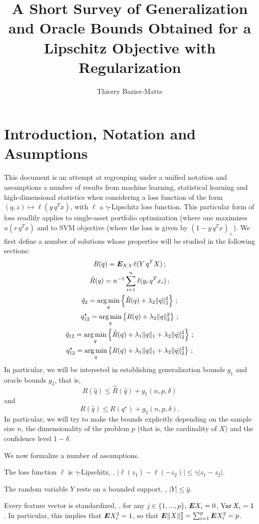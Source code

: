 \documentclass{article}
\title{A Short Survey of Generalization and Oracle Bounds Obtained for a Lipschitz
  Objective with Regularization}
\author{Thierry Bazier-Matte}
\begin{document}
\maketitle

\section{Introduction, Notation and Asumptions} 

This document is an attempt at regrouping under a unified notation and assumptions a
number of results from machine learning, statistical learning and high-dimensional
statistics when considering a loss function of the form $(q,z) \mapsto \ell(y\,q^Tx)$,
with $\ell$ a $\gamma$-Lipschitz loss function. This particular form of loss readlily
applies to single-asset portfolio optimization (where one maximizes $u(r\,q^Tx)$ and to
SVM objective (where the loss is given by $(1-y\,q^Tx)_{+}$). We first define a number of
solutions whose properties will be studied in the following sections:
\begin{gather}
  R(q) = \bm E_{X,Y}\ell(Y\,q^TX)\,;\\
  \hat R(q) = n^{-1}\sum_{i=1}^n \ell(y_i\,q^Tx_i)\,;\\
  \hat q_{2} = \operatorname*{arg\,min}_q\left\{\hat R(q) + \lambda_2\|q\|_2^2\right\}\,;\\
  q_{12}^\star = \operatorname*{arg\,min}_q\left\{R(q) + \lambda_2\|q\|_2^2\right\}\,;\\
  \hat q_{12} = \operatorname*{arg\,min}_q\left\{\hat R(q) + \lambda_1\|q\|_1 +
    \lambda_2\|q\|_2^2\right\}\,;\\
  q_{12}^\star = \operatorname*{arg\,min}_q\left\{R(q) + \lambda_1\|q\|_1 + \lambda_2\|q\|_2^2\right\}\,;
\end{gather}
In particular, we will be interested in establishing generalization bounds $g_1$ and
oracle bounds $g_2$, that is,
\[
  R(\hat q) \leq \hat R(\hat q) + g_1(n,p,\delta)
\]
and
\[
  R(\hat q) \leq R(q^\star) + g_2(n,p,\delta).
\]
In particular, we will try to make the bounds explicitly depending on the sample size $n$,
the dimensionality of the problem $p$ (that is, the cardinality of $X$) and the confidence
level $1-\delta$.

We now formalize a number of assumptions.
\begin{assumption}
  The loss function $\ell$ is $\gamma$-Lipschitz, \ie, $|\ell(z_1)-\ell(-z_2)| \leq
  \gamma|z_1-z_2|$. 
\end{assumption}
\begin{assumption}
  The random variable $Y$ rests on a bounded support, \ie, $|Y|\leq\bar y$.
\end{assumption}
\begin{assumption}
  Every feature vector is standardized, \ie, for any $j\in\{1,\dots,p\}$, $\bm E X_i = 0$,
  $\operatorname{Var} X_i = 1$. In particular, this implies that $\bm E X_i^2 = 1$, so that
  $\bm E \|X\|^2_2 = \sum_{i=1}^p \bm E X_i^2 = p$.
\end{assumption}
\end{document}
